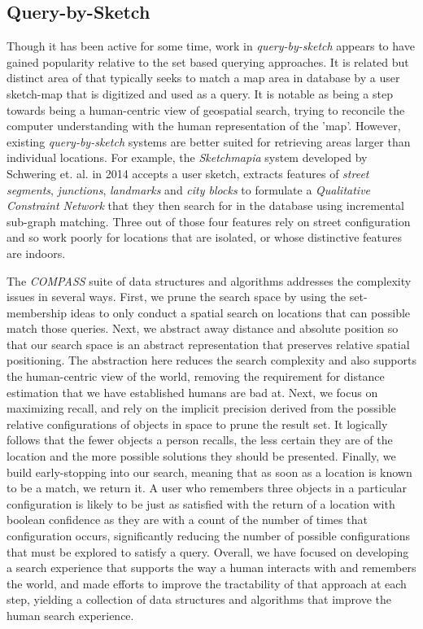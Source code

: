 %
\subsection{Query-by-Sketch}
\par{Though it has been active for some time, work in \textit{query-by-sketch} appears to have gained popularity relative to the set based querying approaches. It is related but distinct area of that typically seeks to match a map area in database by a user sketch-map that is digitized and used as a query. 
It is notable as being a step towards being a human-centric view of geospatial search, trying to reconcile the computer understanding with the human representation of the 'map'. 
However, existing \textit{query-by-sketch} systems are better suited for retrieving areas larger than individual locations.
For example, the \textit{Sketchmapia} system developed by Schwering et. al. in 2014 accepts a user sketch, extracts features of \textit{street segments}, \textit{junctions}, \textit{landmarks} and \textit{city blocks} to formulate a \textit{Qualitative Constraint Network} that they then search for in the database using incremental sub-graph matching. 
Three out of those four features rely on street configuration and so work poorly for locations that are isolated, or whose distinctive features are indoors. 

The \textit{COMPASS} suite of data structures and algorithms addresses the complexity issues in several ways. First, we prune the search space by using the set-membership ideas to only conduct a spatial search on locations that can possible match those queries. 
Next, we abstract away distance and absolute position so that our search space is an abstract representation that preserves relative spatial positioning. 
The abstraction here reduces the search complexity and also supports the human-centric view of the world, removing the requirement for distance estimation that we have established humans are bad at. 
Next, we focus on maximizing recall, and rely on the implicit precision derived from the possible relative configurations of objects in space to prune the result set. 
It logically follows that the fewer objects a person recalls, the less certain they are of the location and the more possible solutions they should be presented. 
Finally, we build early-stopping into our search, meaning that as soon as a location is known to be a match, we return it.
A user who remembers three objects in a particular configuration is likely to be just as satisfied with the return of a location with boolean confidence as they are with a count of the number of times that configuration occurs, significantly reducing the number of possible configurations that must be explored to satisfy a query.
Overall, we have focused on developing a search experience that supports the way a human interacts with and remembers the world, and made efforts to improve the tractability of that approach at each step, yielding a collection of data structures and algorithms that improve the human search experience.}

